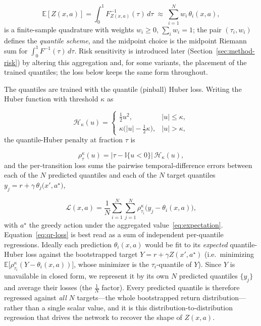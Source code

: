 \documentclass[conference]{IEEEtran}
\begin{document}
\begin{equation}
\mathbb{E}[Z(x,a)] = \int_0^1 F^{-1}_{Z(x,a)}(\tau)\,d\tau
\;\approx\; \sum_{i=1}^{N} w_i\,\theta_i(x,a),
\label{eq:expectation}
\end{equation}
is a finite-sample quadrature with weights $w_i\ge 0$, $\sum_i w_i = 1$; the pair
$(\tau_i,w_i)$ defines the \emph{quantile scheme}, and the midpoint choice is the
midpoint Riemann sum for $\int_0^1 F^{-1}(\tau)\,d\tau$. Risk sensitivity is
introduced later (Section~\ref{sec:method-risk}) by altering this aggregation
and, for some variants, the placement of the trained quantiles; the loss below
keeps the same form throughout.

The quantiles are trained with the quantile (pinball) Huber loss. Writing the
Huber function with threshold $\kappa$ as

\begin{equation}
\mathcal{H}_\kappa(u) =
\begin{cases}
\tfrac12 u^2, & |u|\le\kappa,\\[2pt]
\kappa\big(|u|-\tfrac12\kappa\big), & |u|>\kappa,
\end{cases}
\end{equation}
the quantile-Huber penalty at fraction $\tau$ is

\begin{equation}
\rho^\kappa_\tau(u) = \big|\tau - \mathbb{I}\{u<0\}\big|\,
\mathcal{H}_\kappa(u),
\label{eq:pinball}
\end{equation}
and the per-transition loss sums the pairwise temporal-difference errors between
each of the $N$ predicted quantiles and each of the $N$ target quantiles
$y_j = r + \gamma\,\theta_j\!\big(x',a^\star\big)$,

\begin{equation}
\mathcal{L}(x,a) = \frac{1}{N}\sum_{i=1}^{N}\sum_{j=1}^{N}
   \rho^{\kappa}_{\tau_i}\!\big(y_j - \theta_i(x,a)\big),
\label{eq:qr-loss}
\end{equation}
with $a^\star$ the greedy action under the aggregated value~\eqref{eq:expectation}.
Equation~\eqref{eq:qr-loss} is best read as a sum of independent per-quantile
regressions. Ideally each prediction $\theta_i(x,a)$ would be fit to its
\emph{expected} quantile-Huber loss against the bootstrapped target
$Y = r + \gamma Z(x',a^\star)$ (i.e.\ minimizing
$\mathbb{E}\!\big[\rho^\kappa_{\tau_i}(Y-\theta_i(x,a))\big]$, whose minimizer is
the $\tau_i$-quantile of $Y$). Since $Y$ is unavailable in closed form, we
represent it by its own $N$ predicted quantiles $\{y_j\}$ and average their losses
(the $\tfrac1N$ factor). Every predicted quantile is therefore regressed
against \emph{all} $N$ targets---the whole bootstrapped return distribution---rather
than a single scalar value, and it is this distribution-to-distribution regression
that drives the network to recover the shape of $Z(x,a)$.
\end{document}
